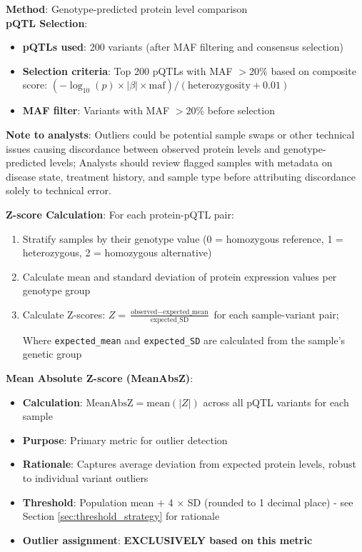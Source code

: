 \documentclass[11pt,a4paper]{article}
\begin{document}
\textbf{Method}: Genotype-predicted protein level comparison\\

\textbf{pQTL Selection}:
\begin{itemize}
\item \textbf{pQTLs used}: 200 variants (after MAF filtering and consensus selection)
\item \textbf{Selection criteria}: Top 200 pQTLs with MAF $> 20\%$ based on composite score: $(-\log_{10}(p) \times |\beta| \times \text{maf}) / (\text{heterozygosity} + 0.01)$
\item \textbf{MAF filter}: Variants with MAF $> 20\%$ before selection
\end{itemize}

\textbf{Note to analysts}: Outliers could be potential sample swaps or other technical issues causing discordance between observed protein levels and genotype-predicted levels; Analysts should review flagged samples with metadata on disease state, treatment history, and sample type before attributing discordance solely to technical error.

\textbf{Z-score Calculation}:
For each protein-pQTL pair:
\begin{enumerate}
\item Stratify samples by their genotype value (0 = homozygous reference, 1 = heterozygous, 2 = homozygous alternative)
\item Calculate mean and standard deviation of protein expression values per genotype group
\item Calculate Z-scores: $Z = \frac{\text{observed} - \text{expected\_mean}}{\text{expected\_SD}}$ for each sample-variant pair;

Where \texttt{expected\_mean} and \texttt{expected\_SD} are calculated from the sample's genetic group

\end{enumerate}

\textbf{Mean Absolute Z-score (MeanAbsZ)}:
\begin{itemize}
\item \textbf{Calculation}: $\text{MeanAbsZ} = \text{mean}(|Z|)$ across all pQTL variants for each sample
\item \textbf{Purpose}: Primary metric for outlier detection
\item \textbf{Rationale}: Captures average deviation from expected protein levels, robust to individual variant outliers
\item \textbf{Threshold}: Population mean $+$ 4 $\times$ SD (rounded to 1 decimal place) - see Section \ref{sec:threshold_strategy} for rationale
\item \textbf{Outlier assignment}: \textbf{EXCLUSIVELY based on this metric}
\end{itemize}
\end{document}
